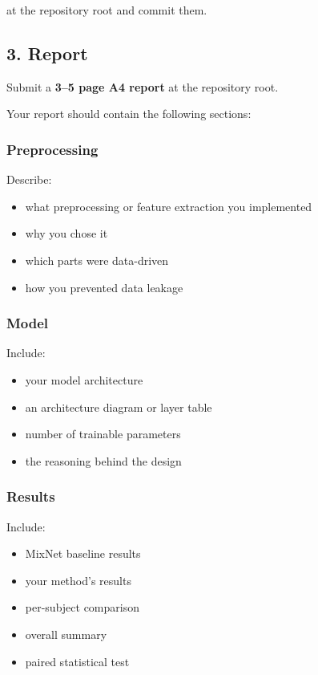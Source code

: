 \documentclass[
  10pt,
]{article}
\begin{document}
at the repository root and commit them.

\subsection{3. Report}\label{report}

Submit a \textbf{3--5 page A4 report} at the repository root.

Your report should contain the following sections:

\subsubsection{Preprocessing}\label{preprocessing}

Describe:

\begin{itemize}
\item
  what preprocessing or feature extraction you implemented
\item
  why you chose it
\item
  which parts were data-driven
\item
  how you prevented data leakage
\end{itemize}

\subsubsection{Model}\label{model}

Include:

\begin{itemize}
\item
  your model architecture
\item
  an architecture diagram or layer table
\item
  number of trainable parameters
\item
  the reasoning behind the design
\end{itemize}

\subsubsection{Results}\label{results-1}

Include:

\begin{itemize}
\item
  MixNet baseline results
\item
  your method's results
\item
  per-subject comparison
\item
  overall summary
\item
  paired statistical test
\end{itemize}
\end{document}
